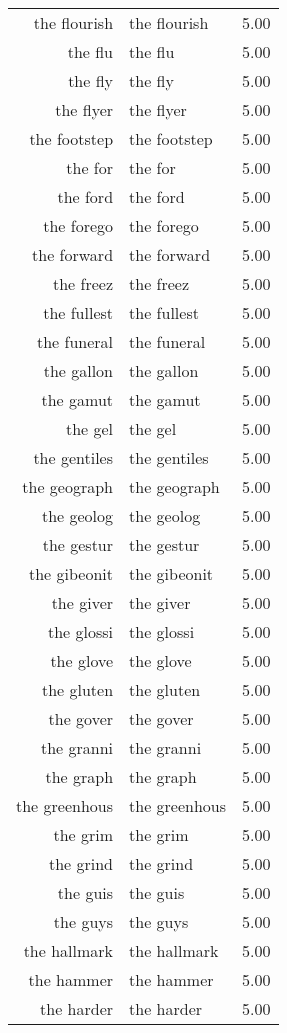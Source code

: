 \begin{table}[ht]
\begin{tabular}{rlr}
  the flourish & the flourish & 5.00 \\ 
  the flu & the flu & 5.00 \\ 
  the fly & the fly & 5.00 \\ 
  the flyer & the flyer & 5.00 \\ 
  the footstep & the footstep & 5.00 \\ 
  the for & the for & 5.00 \\ 
  the ford & the ford & 5.00 \\ 
  the forego & the forego & 5.00 \\ 
  the forward & the forward & 5.00 \\ 
  the freez & the freez & 5.00 \\ 
  the fullest & the fullest & 5.00 \\ 
  the funeral & the funeral & 5.00 \\ 
  the gallon & the gallon & 5.00 \\ 
  the gamut & the gamut & 5.00 \\ 
  the gel & the gel & 5.00 \\ 
  the gentiles & the gentiles & 5.00 \\ 
  the geograph & the geograph & 5.00 \\ 
  the geolog & the geolog & 5.00 \\ 
  the gestur & the gestur & 5.00 \\ 
  the gibeonit & the gibeonit & 5.00 \\ 
  the giver & the giver & 5.00 \\ 
  the glossi & the glossi & 5.00 \\ 
  the glove & the glove & 5.00 \\ 
  the gluten & the gluten & 5.00 \\ 
  the gover & the gover & 5.00 \\ 
  the granni & the granni & 5.00 \\ 
  the graph & the graph & 5.00 \\ 
  the greenhous & the greenhous & 5.00 \\ 
  the grim & the grim & 5.00 \\ 
  the grind & the grind & 5.00 \\ 
  the guis & the guis & 5.00 \\ 
  the guys & the guys & 5.00 \\ 
  the hallmark & the hallmark & 5.00 \\ 
  the hammer & the hammer & 5.00 \\ 
  the harder & the harder & 5.00 \\ 

\end{tabular}
\end{table}
